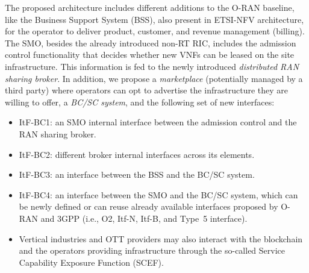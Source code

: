 \documentclass[journal]{IEEEtran}
\begin{document}
	The proposed architecture includes different additions to the O-RAN baseline, like the Business Support System (BSS), also present in ETSI-NFV architecture, for the operator to deliver product, customer, and revenue management (billing). The SMO, besides the already introduced non-RT RIC, includes the admission control functionality that decides whether new VNFs can be leased on the site infrastructure. This information is fed to the newly introduced \textit{distributed RAN sharing broker}. In addition, we propose a \textit{marketplace} (potentially managed by a third party) where operators can opt to advertise the infrastructure they are willing to offer, a \textit{BC/SC system}, and the following set of new interfaces: 
	\begin{itemize}
		\item ItF-BC1: an SMO internal interface between the admission control and the RAN sharing broker.
		\item ItF-BC2: different broker internal interfaces across its elements.
		\item ItF-BC3: an interface between the BSS and the BC/SC system.
		\item ItF-BC4: an interface between the SMO and the BC/SC system, which can be newly defined or can reuse already available interfaces proposed by O-RAN and 3GPP (i.e., O2, Itf-N, Itf-B, and Type~5 interface).
		\item Vertical industries and OTT providers may also interact with the blockchain and the operators providing infrastructure through the so-called Service Capability Exposure Function (SCEF).
	\end{itemize}
	
\end{document}
